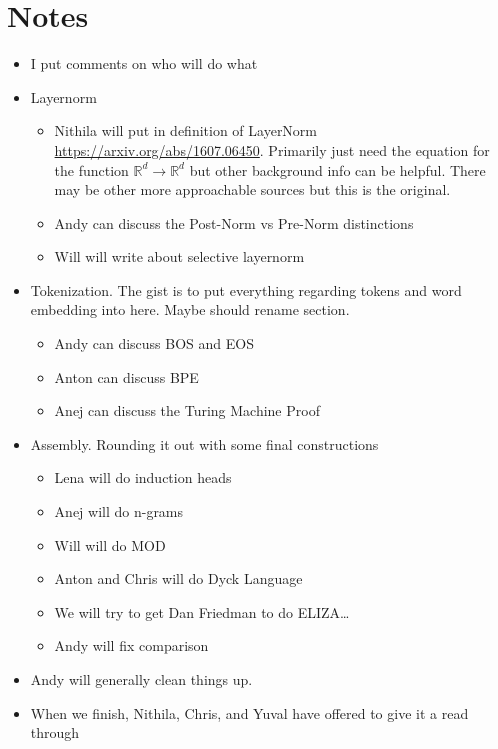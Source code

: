 \documentclass{article}
\begin{document}
\section{Notes}
\begin{itemize}
    \item I put comments on who will do what
    \item Layernorm
        \begin{itemize}
            \item Nithila will put in definition of LayerNorm \url{https://arxiv.org/abs/1607.06450}. Primarily just need the equation for the function $\mathbb{R}^d\to\mathbb{R}^d$ but other background info can be helpful. There may be other more approachable sources but this is the original.
            \item Andy can discuss the Post-Norm vs Pre-Norm distinctions
            \item Will will write about selective layernorm
        \end{itemize}
    \item Tokenization. The gist is to put everything regarding tokens and word embedding into here. Maybe should rename section.
        \begin{itemize}
            \item Andy can discuss BOS and EOS
            \item Anton can discuss BPE
            \item Anej can discuss the Turing Machine Proof
        \end{itemize}
    \item Assembly. Rounding it out with some final constructions
        \begin{itemize}
            \item Lena will do induction heads
            \item Anej will do n-grams
            \item Will will do MOD
            \item Anton and Chris will do Dyck Language
            \item We will try to get Dan Friedman to do ELIZA\ldots
            \item Andy will fix comparison
        \end{itemize}
    \item Andy will generally clean things up.
    \item When we finish, Nithila, Chris, and Yuval have offered to give it a read through
\end{itemize}



\end{document}
